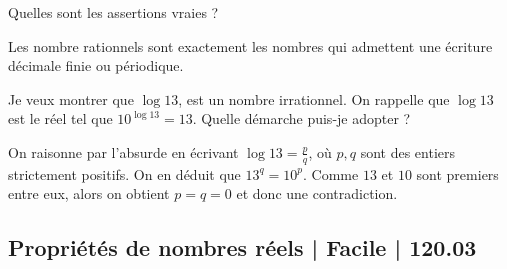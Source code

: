 \begin{question}
Quelles sont les assertions vraies ?
\begin{answers}



   
\end{answers}
\begin{explanations}
Les nombre rationnels sont exactement les nombres qui admettent une écriture décimale finie ou périodique.
\end{explanations}
\end{question}


\begin{question}
Je veux montrer que $\log 13$, est un nombre irrationnel. On rappelle que $\log 13$ est le réel tel que $10^{\log 13} = 13$. Quelle démarche puis-je adopter ?
\begin{answers}




\end{answers}
\begin{explanations}
On raisonne par l'absurde en écrivant $\log 13 = \frac pq$, où $p,q$ sont des entiers strictement positifs. On en déduit que $13^q = 10^p$. Comme $13$ et $10$ sont premiers entre eux, alors on obtient $p=q=0$ et donc une contradiction.
\end{explanations}
\end{question}

\subsection{Propriétés de nombres réels | Facile | 120.03}



